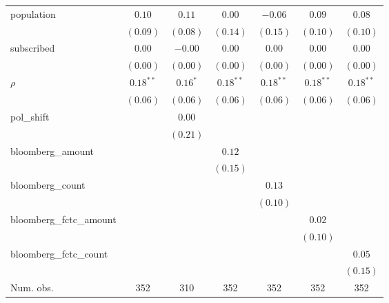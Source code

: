\begin{table}[!h]
\begin{center}
\begin{tabular}{l c c c c c c }
population              & $0.10$       & $0.11$       & $0.00$       & $-0.06$      & $0.09$       & $0.08$       \\
                        & $(0.09)$     & $(0.08)$     & $(0.14)$     & $(0.15)$     & $(0.10)$     & $(0.10)$     \\
subscribed              & $0.00$       & $-0.00$      & $0.00$       & $0.00$       & $0.00$       & $0.00$       \\
                        & $(0.00)$     & $(0.00)$     & $(0.00)$     & $(0.00)$     & $(0.00)$     & $(0.00)$     \\
$\rho$                  & $0.18^{**}$  & $0.16^{*}$   & $0.18^{**}$  & $0.18^{**}$  & $0.18^{**}$  & $0.18^{**}$  \\
                        & $(0.06)$     & $(0.06)$     & $(0.06)$     & $(0.06)$     & $(0.06)$     & $(0.06)$     \\
pol\_shift              &              & $0.00$       &              &              &              &              \\
                        &              & $(0.21)$     &              &              &              &              \\
bloomberg\_amount       &              &              & $0.12$       &              &              &              \\
                        &              &              & $(0.15)$     &              &              &              \\
bloomberg\_count        &              &              &              & $0.13$       &              &              \\
                        &              &              &              & $(0.10)$     &              &              \\
bloomberg\_fctc\_amount &              &              &              &              & $0.02$       &              \\
                        &              &              &              &              & $(0.10)$     &              \\
bloomberg\_fctc\_count  &              &              &              &              &              & $0.05$       \\
                        &              &              &              &              &              & $(0.15)$     \\
\midrule
Num. obs.               & 352          & 310          & 352          & 352          & 352          & 352          \\

\end{tabular}
\end{center}
\end{table}
